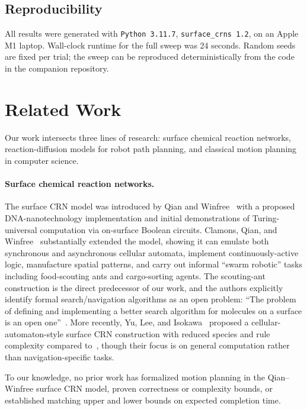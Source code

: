 \documentclass[11pt]{article}
\theoremstyle{plain}
\theoremstyle{definition}
\theoremstyle{remark}
\begin{document}
\subsection{Reproducibility}

All results were generated with \texttt{Python 3.11.7}, \texttt{surface\_crns 1.2}, on an Apple M1 laptop. Wall-clock runtime for the full sweep was 24 seconds. Random seeds are fixed per trial; the sweep can be reproduced deterministically from the code in the companion repository.

\section{Related Work}
\label{sec:related}

Our work intersects three lines of research: surface chemical reaction networks, reaction-diffusion models for robot path planning, and classical motion planning in computer science.

\paragraph{Surface chemical reaction networks.} The surface CRN model was introduced by Qian and Winfree~\cite{qian2014} with a proposed DNA-nanotechnology implementation and initial demonstrations of Turing-universal computation via on-surface Boolean circuits. Clamons, Qian, and Winfree~\cite{clamons2020} substantially extended the model, showing it can emulate both synchronous and asynchronous cellular automata, implement continuously-active logic, manufacture spatial patterns, and carry out informal ``swarm robotic'' tasks including food-scouting ants and cargo-sorting agents. The scouting-ant construction is the direct predecessor of our work, and the authors explicitly identify formal search/navigation algorithms as an open problem: ``The problem of defining and implementing a better search algorithm for molecules on a surface is an open one''~\cite[\S 6]{clamons2020}. More recently, Yu, Lee, and Isokawa~\cite{yu2024} proposed a cellular-automaton-style surface CRN construction with reduced species and rule complexity compared to~\cite{clamons2020}, though their focus is on general computation rather than navigation-specific tasks.

To our knowledge, no prior work has formalized motion planning in the Qian--Winfree surface CRN model, proven correctness or complexity bounds, or established matching upper and lower bounds on expected completion time.
\end{document}
